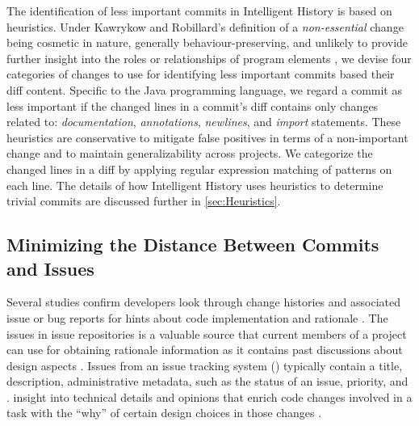 The identification of less important commits in Intelligent History is based on heuristics.
Under Kawrykow and Robillard's definition of a \emph{non-essential} change being cosmetic in nature, 
generally behaviour-preserving, and unlikely to provide further insight into the roles or relationships of program elements \cite{kawrykow_non-essential_2011}, 
we devise four categories of changes to use for identifying less important commits based their diff content.
Specific to the Java programming language, we regard a commit as less important if the changed lines in a commit's diff contains only changes related to: 
\emph{documentation}, \emph{annotations}, \emph{newlines}, and \emph{import} statements.
These heuristics are conservative to mitigate false positives in terms of a non-important change and to maintain generalizability across projects.
We categorize the changed lines in a diff by applying regular expression matching of patterns on each line.
The details of how Intelligent History uses heuristics to determine trivial commits are discussed further in \autoref{sec:Heuristics}.

\subsection{Minimizing the Distance Between Commits and Issues}
\label{subsec:Minimize-Commit-Issue-Distance}

Several studies confirm developers look through change histories and associated issue 
or bug reports for hints about code implementation and rationale \cite{ko_information_2007,robillard_turnover-induced_2021, rastkar_why_2013}.
The issues in issue repositories is a valuable source that current members 
of a project can use for obtaining rationale information as it contains past discussions about design aspects \cite{brunet_design_2014,hassan_road_2008}.
Issues from an issue tracking system () typically contain a title, description, administrative metadata, such as the status of an issue, priority, 
and .
 insight into technical details 
and opinions that enrich code changes involved in a task with the ``why'' of 
certain design choices in those changes \cite{ortu_jira_2015}.

